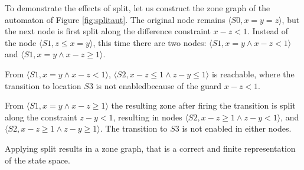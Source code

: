 \begin{example}
To demonstrate the effects of split, let us construct the zone graph of the automaton of Figure \ref{fig:splitaut}. The original node remains  $\langle S0,x=y=z \rangle$, but the next node is first split along the difference constraint $x-z<1$. Instead of the node $\langle S1,z \leq x=y \rangle$, this time there are two nodes: $\langle S1, x=y \wedge x-z<1 \rangle$ and $\langle S1, x=y \wedge x-z \geq 1 \rangle$.

From  $\langle S1, x=y \wedge x-z<1 \rangle$,  $\langle S2,x-z \leq 1 \wedge z-y \leq 1\rangle$ is reachable, where the transition to location $S3$ is not enabledbecause of the guard $x-z < 1$.

From $\langle S1, x=y \wedge x-z \geq 1 \rangle$ the resulting zone after firing the transition is split along the constraint $z-y<1$, resulting in nodes $\langle S2, x-z \geq 1 \wedge z-y < 1\rangle$, and $\langle S2, x-z \geq 1 \wedge z-y \geq 1\rangle$. The transition to $S3$ is not enabled in either nodes. 
\end{example}

Applying split results in a zone graph, that is a correct and finite representation of the state space.



